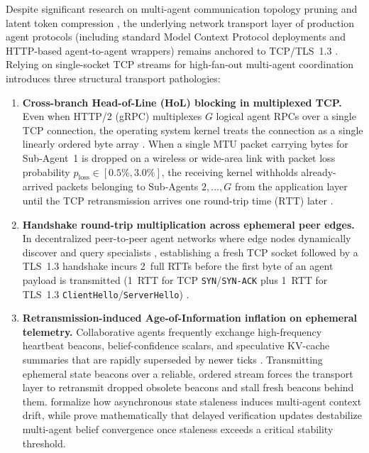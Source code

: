 \documentclass[11pt]{article}
\begin{document}
Despite significant research on multi-agent communication topology pruning \citep{zhang2025agentprune, arxiv2410_11782} and latent token compression \citep{arxiv2511_20639}, the underlying network transport layer of production agent protocols (including standard Model Context Protocol deployments and HTTP-based agent-to-agent wrappers) remains anchored to TCP/TLS~1.3 \citep{rescorla2018rfc8446}. Relying on single-socket TCP streams for high-fan-out multi-agent coordination introduces three structural transport pathologies:
\begin{enumerate}
  \item \textbf{Cross-branch Head-of-Line (HoL) blocking in multiplexed TCP.} Even when HTTP/2 (gRPC) multiplexes $G$ logical agent RPCs over a single TCP connection, the operating system kernel treats the connection as a single linearly ordered byte array \citep{langley2017quic, iyengar2021rfc9000}. When a single MTU packet carrying bytes for Sub-Agent~1 is dropped on a wireless or wide-area link with packet loss probability $p_{\mathrm{loss}} \allowbreak \in [0.5\%,\allowbreak 3.0\%]$, the receiving kernel withholds already-arrived packets belonging to Sub-Agents $2, \dots, G$ from the application layer until the TCP retransmission arrives one round-trip time ($\mathrm{RTT}$) later \citep{kuehlewind2022rfc9308}.
  \item \textbf{Handshake round-trip multiplication across ephemeral peer edges.} In decentralized peer-to-peer agent networks where edge nodes dynamically discover and query specialists \citep{ari2018_18, nandakumar2026pace}, establishing a fresh TCP socket followed by a TLS~1.3 handshake incurs 2~full RTTs before the first byte of an agent payload is transmitted (1~RTT for TCP \texttt{SYN}/\texttt{SYN-ACK} plus 1~RTT for TLS~1.3 \texttt{ClientHello}/\texttt{ServerHello}) \citep{rescorla2018rfc8446}.
  \item \textbf{Retransmission-induced Age-of-Information inflation on ephemeral telemetry.} Collaborative agents frequently exchange high-frequency heartbeat beacons, belief-confidence scalars, and speculative KV-cache summaries that are rapidly superseded by newer ticks \citep{rodrigues2026drift, itkin2026delayed}. Transmitting ephemeral state beacons over a reliable, ordered stream forces the transport layer to retransmit dropped obsolete beacons and stall fresh beacons behind them. \citet{rodrigues2026drift} formalize how asynchronous state staleness induces multi-agent context drift, while \citet{itkin2026delayed} prove mathematically that delayed verification updates destabilize multi-agent belief convergence once staleness exceeds a critical stability threshold.
\end{enumerate}
\end{document}
